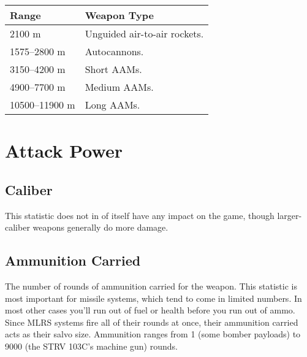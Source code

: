 \documentclass{article}
\begin{document}
\begin{center}
    \begin{tabular}{ | l | p{4.5cm} | }
    \hline
    Range & Weapon Type \\ \hline
    2100 m & Unguided air-to-air rockets.\\
    1575--2800 m & Autocannons.\\
    3150--4200 m & Short AAMs. \\
    4900--7700 m & Medium AAMs. \\
    10500--11900 m & Long AAMs. \\
    \hline
    \end{tabular}
\end{center}

\section{Attack Power}

\subsection{Caliber}

This statistic does not in of itself have any impact on the game, though
larger-caliber weapons generally do more damage.

\subsection{Ammunition Carried}

The number of rounds of ammunition carried for the weapon. This statistic
is most important for missile systems, which tend to come in limited numbers.
In most other cases you'll run out of fuel or health before you run out of
ammo. Since MLRS systems fire all of their rounds at once, their ammunition
carried acts as their salvo size. Ammunition ranges from 1 (some bomber
payloads) to 9000 (the STRV 103C's machine gun) rounds.
\end{document}
